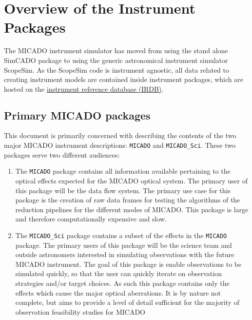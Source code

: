 

\section{Overview of the Instrument Packages%
  \label{overview-of-the-instrument-packages}%
}

The MICADO instrument simulator has moved from using the stand alone SimCADO package to using the generic astronomical instrument simulator ScopeSim.
As the ScopeSim code is instrument agnostic, all data related to creating instrument models are contained inside instrument packages, which are hosted on the \href{https://github.com/astronomyk/irdb}{instrument reference database (IRDB)}.


\subsection{Primary MICADO packages%
  \label{primary-micado-packages}%
}

This document is primarily concerned with describing the contents of the two major MICADO instrument descriptions: \texttt{MICADO} and \texttt{MICADO\_Sci}.
These two packages serve two different audiences:

\begin{enumerate}
\item The \texttt{MICADO} package contains all information available pertaining to the optical effects expected for the MICADO optical system.
The primary user of this package will be the data flow system.
The primary use case for this package is the creation of raw data frames for testing the algorithms of the reduction pipelines for the different modes of MICADO.
This package is large and therefore computationally expensive and slow.

\item The \texttt{MICADO\_Sci} package contains a subset of the effects in the \texttt{MICADO} package.
The primary users of this package will be the science team and outside astronomers interested in simulating observations with the future MICADO instrument.
The goal of this package is enable observations to be simulated quickly, so that the user can quickly iterate on observation strategies and/or target choices.
As such this package contains only the effects which cause the major optical aberrations.
It is by nature not complete, but aims to provide a level of detail sufficient for the majority of observation feasibility studies for MICADO
\end{enumerate}


